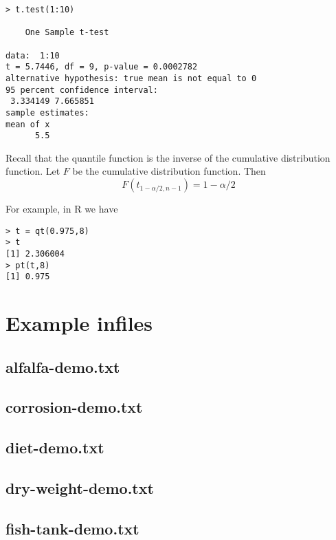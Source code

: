 \documentclass[11pt]{article}
\begin{document}
\begin{Verbatim}
> t.test(1:10)

	One Sample t-test

data:  1:10
t = 5.7446, df = 9, p-value = 0.0002782
alternative hypothesis: true mean is not equal to 0
95 percent confidence interval:
 3.334149 7.665851
sample estimates:
mean of x 
      5.5 
\end{Verbatim}

Recall that the quantile function
is the inverse of the cumulative
distribution function.
Let $F$ be the cumulative distribution function.
Then
\[
F(t_{1-\alpha/2,n-1})=1-\alpha/2
\]

For example, in R we have

\begin{Verbatim}
> t = qt(0.975,8)
> t
[1] 2.306004
> pt(t,8)
[1] 0.975
\end{Verbatim}

\newpage

\section{Example infiles}

\subsection{alfalfa-demo.txt}


\newpage
\subsection{corrosion-demo.txt}


\newpage
\subsection{diet-demo.txt}


\newpage
\subsection{dry-weight-demo.txt}


\newpage
\subsection{fish-tank-demo.txt}

\end{document}

